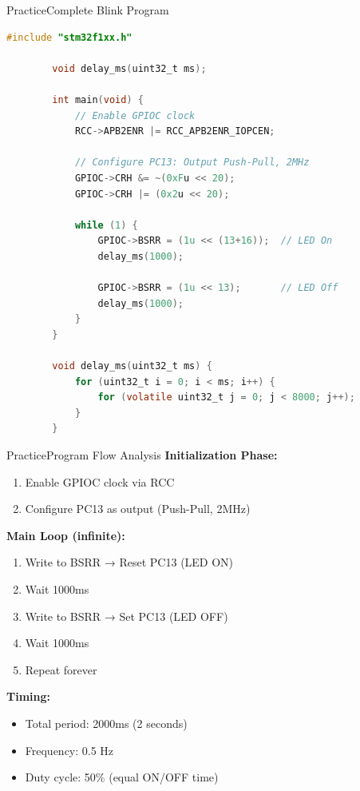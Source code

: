 \documentclass{beamer}
\begin{document}
\begin{frame}[fragile]{Practice}{Complete Blink Program}
	\begin{lstlisting}[language=C, basicstyle=\ttfamily\tiny]
		#include "stm32f1xx.h"
		
		void delay_ms(uint32_t ms);
		
		int main(void) {
			// Enable GPIOC clock
			RCC->APB2ENR |= RCC_APB2ENR_IOPCEN;
			
			// Configure PC13: Output Push-Pull, 2MHz
			GPIOC->CRH &= ~(0xFu << 20);
			GPIOC->CRH |= (0x2u << 20);
			
			while (1) {
				GPIOC->BSRR = (1u << (13+16));  // LED On
				delay_ms(1000);
				
				GPIOC->BSRR = (1u << 13);       // LED Off
				delay_ms(1000);
			}
		}
		
		void delay_ms(uint32_t ms) {
			for (uint32_t i = 0; i < ms; i++) {
				for (volatile uint32_t j = 0; j < 8000; j++);
			}
		}
	\end{lstlisting}
\end{frame}
\begin{frame}{Practice}{Program Flow Analysis}
	\textbf{Initialization Phase:}
	\begin{enumerate}
		\item Enable GPIOC clock via RCC
		\item Configure PC13 as output (Push-Pull, 2MHz)
	\end{enumerate}
	
	\medskip
	\textbf{Main Loop (infinite):}
	\begin{enumerate}
		\item Write to BSRR → Reset PC13 (LED ON)
		\item Wait 1000ms
		\item Write to BSRR → Set PC13 (LED OFF)
		\item Wait 1000ms
		\item Repeat forever
	\end{enumerate}
	
	\medskip
	\textbf{Timing:}
	\begin{itemize}
		\item Total period: 2000ms (2 seconds)
		\item Frequency: 0.5 Hz
		\item Duty cycle: 50\% (equal ON/OFF time)
	\end{itemize}
\end{frame}
\end{document}
